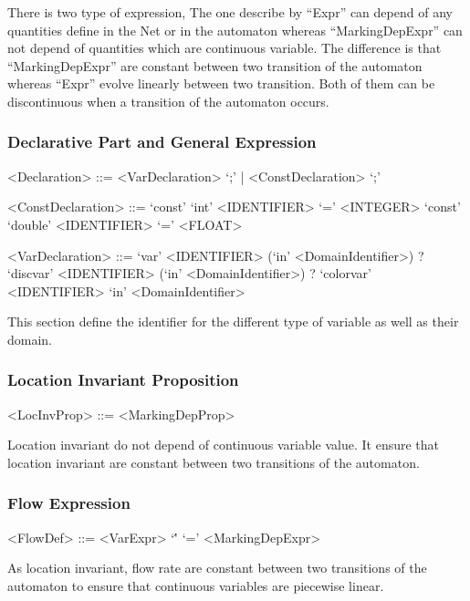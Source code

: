 \documentclass{article}
\begin{document}
There is two type of expression, The one describe
by ``Expr'' can depend of any quantities define in the Net or in the
automaton whereas ``MarkingDepExpr'' can not depend of quantities
which are continuous variable. The difference is that
``MarkingDepExpr'' are constant between two transition of the
automaton whereas ``Expr'' evolve linearly between two
transition. Both of them can be discontinuous when a transition of the
automaton occurs.


\subsubsection{Declarative Part and General Expression}

\begin{scriptsize}
\begin{grammar}
  <Declaration> ::= <VarDeclaration> `;' | <ConstDeclaration> `;'

  <ConstDeclaration> ::= 
  `const' `int' <IDENTIFIER> `=' <INTEGER>
  \alt `const' `double' <IDENTIFIER> `=' <FLOAT>

  <VarDeclaration> ::= 
   `var' <IDENTIFIER> (`in' <DomainIdentifier>) ?
   \alt `discvar' <IDENTIFIER> (`in' <DomainIdentifier>) ?
   \alt `colorvar' <IDENTIFIER> `in' <DomainIdentifier>
\end{grammar}
\end{scriptsize}

This section define the identifier for the different type of variable
as well as their domain.

\subsubsection{Location Invariant Proposition}

\begin{scriptsize}
\begin{grammar}
  <LocInvProp> ::= <MarkingDepProp>
\end{grammar}
\end{scriptsize}

Location invariant do not depend of continuous variable value.
It ensure that location invariant are constant between two transitions
of the automaton.

\subsubsection{Flow Expression}

\begin{scriptsize}
\begin{grammar}
  <FlowDef> ::= <VarExpr> `\'' `=' <MarkingDepExpr> 
\end{grammar}
\end{scriptsize}
As location invariant, flow rate are constant between two transitions
of the automaton to ensure that continuous variables are piecewise
linear.
\end{document}

